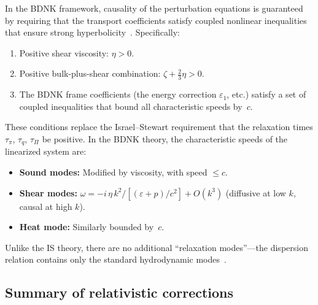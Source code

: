 In the BDNK framework, causality of the perturbation equations is
guaranteed by requiring that the transport coefficients satisfy
coupled nonlinear inequalities that ensure strong
hyperbolicity~\cite{BemficaDN2018,Kovtun2019,BemficaDNK2023}.
Specifically:
\begin{enumerate}
\item[(i)] Positive shear viscosity: $\eta > 0$.
\item[(ii)] Positive bulk-plus-shear combination:
  $\zeta + \tfrac{2}{3}\eta > 0$.
\item[(iii)] The BDNK frame coefficients (the energy correction
  $\varepsilon_{1}$, etc.) satisfy a set of coupled inequalities that
  bound all characteristic speeds by~$c$.
\end{enumerate}
These conditions replace the Israel--Stewart requirement that the
relaxation times $\tau_{\pi}$, $\tau_{q}$, $\tau_{\Pi}$ be positive.
In the BDNK theory, the characteristic speeds of the linearized system
are:
\begin{itemize}
\item \textbf{Sound modes:} Modified by viscosity, with speed $\leq c$.
\item \textbf{Shear modes:}
  $\omega = -i\,\eta\,k^{2}/[(\varepsilon + p)/c^{2}] + O(k^{3})$
  (diffusive at low $k$, causal at high $k$).
\item \textbf{Heat mode:} Similarly bounded by~$c$.
\end{itemize}
Unlike the IS theory, there are no additional ``relaxation modes''---the
dispersion relation contains only the standard hydrodynamic
modes~\cite{Kovtun2019,HoultKovtun2020}.

\subsection{Summary of relativistic corrections}
\label{subsec:rel-56-summary}

